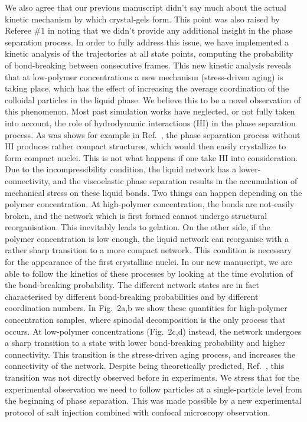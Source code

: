 \documentclass[11pt,a4paper]{article}
\begin{document}
We also agree that our previous manuscript didn't say much about the actual kinetic mechanism by which crystal-gels form. This point was also raised by Referee \#1 in noting that we didn't provide any additional insight in the phase separation process. In order to fully address this issue, we have implemented a kinetic analysis of the trajectories at all state points, computing the probability of bond-breaking between consecutive frames. This new kinetic analysis reveals that at low-polymer concentrations a new mechanism (stress-driven aging) is taking place, which has the effect of increasing the average coordination of the colloidal particles in the liquid phase.
We believe this to be a novel observation of this phenomenon. Most past simulation works have neglected, or not fully taken into account, the role of hydrodynamic interactions (HI) in the phase separation process. As was shows for example in Ref.~\cite{furukawa2010key}, the phase separation process without HI produces rather compact structures, which would then easily crystallize to form compact nuclei. This is not what happens if one take HI into consideration. Due to the incompressibility condition, the liquid network has a lower-connectivity, and the viscoelastic phase separation results in the accumulation of mechanical stress on these liquid bonds. Two things can happen depending on the polymer concentration. At high-polymer concentration, the bonds are not-easily broken, and the network which is first formed cannot undergo structural reorganisation. This inevitably leads to gelation. On the other side, if the polymer concentration is low enough, the liquid network can reorganise with a rather sharp 
transition to a more compact network. This condition is necessary for the appearance of the first crystalline nuclei. In our new manuscript, we are able to follow the kinetics of these processes by looking at the time evolution of the bond-breaking probability. The different network states are in fact characterised by different bond-breaking probabilities and by different coordination numbers. In Fig.~2a,b we show these quantities for high-polymer concentration samples, where spinodal decomposition is the only process that occurs. At low-polymer concentrations (Fig.~2c,d) instead, the network undergoes a sharp transition to a state with lower bond-breaking probability and higher connectivity. This transition is the stress-driven aging process, and increases the connectivity of the network. Despite being theoretically predicted, Ref.~\cite{tanaka2000,tanaka2007spontaneous}, this transition was not directly observed before in experiments. 
We stress that for the experimental observation we need to follow particles at a single-particle level from the beginning of phase separation. This was made possible by a new experimental protocol of salt injection combined with confocal microscopy observation. 
\end{document}
